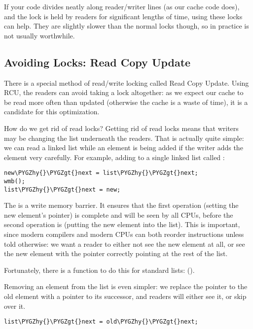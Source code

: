\documentclass[a4paper,8pt,english]{sphinxmanual}
\def\PYGZgt{\char`\>}
\def\PYGZhy{\char`\-}
\begin{document}
If your code divides neatly along reader/writer lines (as our cache code
does), and the lock is held by readers for significant lengths of time,
using these locks can help. They are slightly slower than the normal
locks though, so in practice  is not usually worthwhile.


\subsection{Avoiding Locks: Read Copy Update}
\label{kernel-hacking/locking:avoiding-locks-read-copy-update}
There is a special method of read/write locking called Read Copy Update.
Using RCU, the readers can avoid taking a lock altogether: as we expect
our cache to be read more often than updated (otherwise the cache is a
waste of time), it is a candidate for this optimization.

How do we get rid of read locks? Getting rid of read locks means that
writers may be changing the list underneath the readers. That is
actually quite simple: we can read a linked list while an element is
being added if the writer adds the element very carefully. For example,
adding  to a single linked list called :

\begin{Verbatim}[commandchars=\\\{\}]
new\PYGZhy{}\PYGZgt{}next = list\PYGZhy{}\PYGZgt{}next;
wmb();
list\PYGZhy{}\PYGZgt{}next = new;
\end{Verbatim}

The  is a write memory barrier. It ensures that the
first operation (setting the new element's  pointer) is complete
and will be seen by all CPUs, before the second operation is (putting
the new element into the list). This is important, since modern
compilers and modern CPUs can both reorder instructions unless told
otherwise: we want a reader to either not see the new element at all, or
see the new element with the  pointer correctly pointing at the
rest of the list.

Fortunately, there is a function to do this for standard
 lists:
 ().

Removing an element from the list is even simpler: we replace the
pointer to the old element with a pointer to its successor, and readers
will either see it, or skip over it.

\begin{Verbatim}[commandchars=\\\{\}]
list\PYGZhy{}\PYGZgt{}next = old\PYGZhy{}\PYGZgt{}next;
\end{Verbatim}
\end{document}
